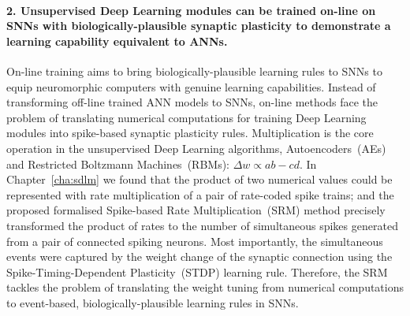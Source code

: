 \paragraph{2. Unsupervised Deep Learning modules can be trained on-line on SNNs with biologically-plausible synaptic plasticity to demonstrate a learning capability equivalent to ANNs.\\}


On-line training aims to bring biologically-plausible learning rules to SNNs to equip neuromorphic computers with genuine learning capabilities.
Instead of transforming off-line trained ANN models to SNNs, on-line methods face the problem of translating numerical computations for training Deep Learning modules into spike-based synaptic plasticity rules.
Multiplication is the core operation in the unsupervised Deep Learning algorithms, Autoencoders~(AEs) and Restricted Boltzmann Machines~(RBMs): $\Delta w \propto ab-cd$.
In Chapter~\ref{cha:sdlm} we found that the product of two numerical values could be represented with rate multiplication of a pair of rate-coded spike trains;
and the proposed formalised Spike-based Rate Multiplication~(SRM) method precisely transformed the product of rates to the number of simultaneous spikes generated from a pair of connected spiking neurons.
Most importantly, the simultaneous events were captured by the weight change of the synaptic connection using the Spike-Timing-Dependent Plasticity~(STDP) learning rule.
Therefore, the SRM tackles the problem of translating the weight tuning from numerical computations to event-based, biologically-plausible learning rules in SNNs.

